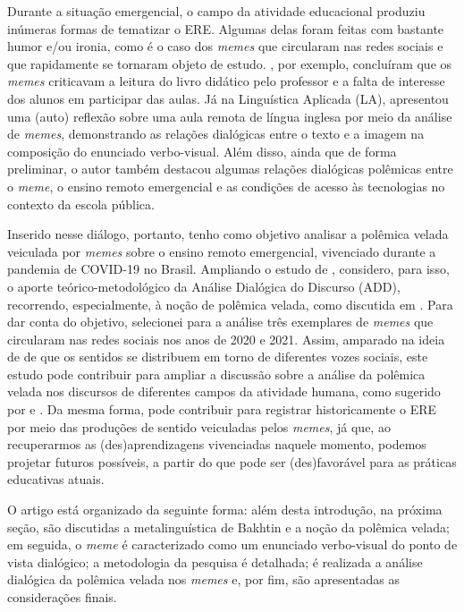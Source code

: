 \documentclass[portuguese]{textolivre}
\begin{document}
 
Durante a situação emergencial, o campo da atividade educacional produziu inúmeras formas de tematizar o ERE. Algumas delas foram feitas com bastante humor e/ou ironia, como é o caso dos \textit{memes} que circularam nas redes sociais e que rapidamente se tornaram objeto de estudo. \textcite{maddalena2020meme}, por exemplo, concluíram que os \textit{memes} criticavam a leitura do livro didático pelo professor e a falta de interesse dos alunos em participar das aulas. Já na Linguística Aplicada (LA), \textcite{lima2022reflexao} apresentou uma (auto) reflexão sobre uma aula remota de língua inglesa por meio da análise de \textit{memes}, demonstrando as relações dialógicas entre o texto e a imagem na composição do enunciado verbo-visual. Além disso, ainda que de forma preliminar, o autor também destacou algumas relações dialógicas polêmicas entre o \textit{meme}, o ensino remoto emergencial e as condições de acesso às tecnologias no contexto da escola pública.
	
Inserido nesse diálogo, portanto, tenho como objetivo analisar a polêmica velada veiculada por \textit{memes} sobre o ensino remoto emergencial, vivenciado durante a pandemia de COVID-19 no Brasil. Ampliando o estudo de \textcite{lima2022reflexao}, considero, para isso, o aporte teórico-metodológico da Análise Dialógica do Discurso (ADD), recorrendo, especialmente, à noção de polêmica velada, como discutida em \textcite{bakhtin2018problemas}. Para dar conta do objetivo, selecionei para a análise três exemplares de \textit{memes} que circularam nas redes sociais nos anos de 2020 e 2021. Assim, amparado na ideia de \textcite{bakhtin2018problemas} de que os sentidos se distribuem em torno de diferentes vozes sociais, este estudo pode contribuir para ampliar a discussão sobre a análise da polêmica velada nos discursos de diferentes campos da atividade humana, como sugerido por \textcite{silva2019analise} e \textcite{campos2021concepcao}. Da mesma forma, pode contribuir para registrar historicamente o ERE por meio das produções de sentido veiculadas pelos \textit{memes}, já que, ao recuperarmos as (des)aprendizagens vivenciadas naquele momento, podemos projetar futuros possíveis, a partir do que pode ser (des)favorável para as práticas educativas atuais.
	
O artigo está organizado da seguinte forma: além desta introdução, na próxima seção, são discutidas a metalinguística de Bakhtin e a noção da polêmica velada; em seguida, o \textit{meme} é caracterizado como um enunciado verbo-visual do ponto de vista dialógico; a metodologia da pesquisa é detalhada; é realizada a análise dialógica da polêmica velada nos \textit{memes} e, por fim, são apresentadas as considerações finais.
	
\end{document}
